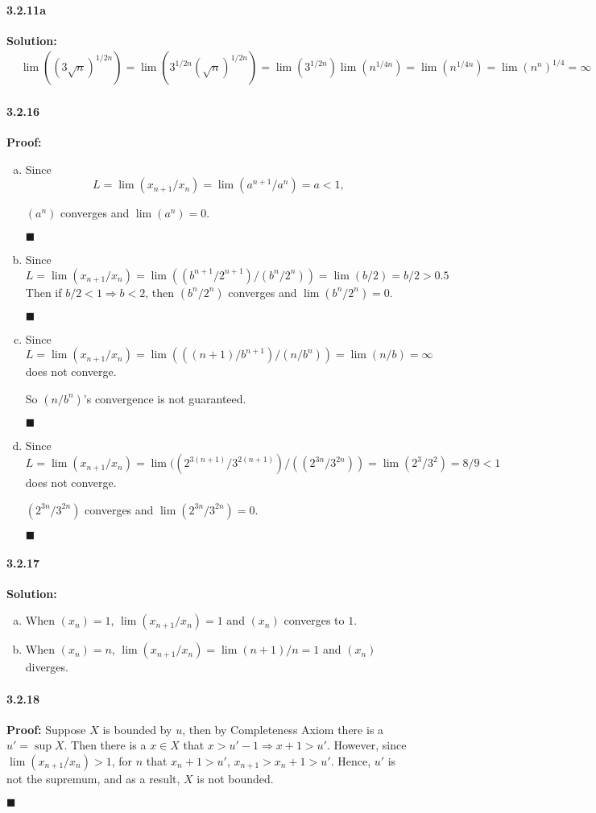\documentclass[11pt]{article}
\newcommand{\qed}{
	\begin{flushright}
		$\blacksquare$
	\end{flushright}		
}
\begin{document}
	\paragraph{3.2.11a}\textbf{Solution:}
		\begin{align}
			&\lim ((3\sqrt{n})^{1/2n}) = \lim (3^{1/2n}(\sqrt{n})^{1/2n}) = \lim (3^{1/2n}) \lim (n^{1/4n}) = \lim (n^{1/4n}) = \lim (n^n)^{1/4} = \infty\nonumber
		\end{align}
	\paragraph{3.2.16}\textbf{Proof:}
		\begin{enumerate}[(a)]
			\item Since
			\[L = \lim (x_{n + 1} / x_n) = \lim (a^{n + 1} / a^n) = a < 1,\]
			
			$(a^n)$ converges and $\lim (a^n) = 0$.\qed
			\item Since 
			\[L = \lim (x_{n + 1} / x_n) = \lim ((b^{n + 1} / 2^{n + 1}) / (b^{n} / 2^{n})) = \lim (b/2) = b/2 > 0.5 \]
			Then if $b/2 < 1 \Rightarrow b < 2$, then $(b^n / 2^n)$ converges and $\lim (b^n / 2^n) = 0$.\qed
			\item Since
			\[L = \lim (x_{n + 1} / x_n) = \lim (((n + 1)/b^{n + 1}) / (n/b^{n})) = \lim (n/b) = \infty\]
			does not converge.
			
			So $(n/b^{n})$'s convergence is not guaranteed.\qed
			\item Since
			\[L = \lim (x_{n + 1} / x_n) = \lim ((2^{3(n + 1)} / 3^{2(n + 1)}) / ((2^{3n} / 3^{2n})) = \lim (2^3 / 3^2) = 8/9 < 1\]
			does not converge.
			
			$(2^{3n} / 3^{2n})$ converges and $\lim (2^{3n} / 3^{2n}) = 0$.\qed
			
		\end{enumerate}
	\paragraph{3.2.17}\textbf{Solution:}
		\begin{enumerate}[(a)]
			\item When $(x_n) = 1$, $\lim (x_{n+1} / x_n) = 1$ and $(x_n)$ converges to $1$.
			\item When  $(x_n) = n$, $\lim (x_{n+1} / x_n) = \lim (n + 1) / n = 1$ and $(x_n)$ diverges.
		\end{enumerate}
	\paragraph{3.2.18}\textbf{Proof:}
		Suppose $X$ is bounded by $u$, then by Completeness Axiom there is a $u' = \sup X$. Then there is a $x \in X$ that $x > u' - 1 \Rightarrow x + 1 > u'$. However, since $\lim(x_{n + 1} / x_n) > 1$, for $n$ that $x_n + 1 > u'$, $x_{n + 1} > x_n + 1 > u'$. Hence, $u'$ is not the supremum, and as a result, $X$ is not bounded.\qed
\end{document}
